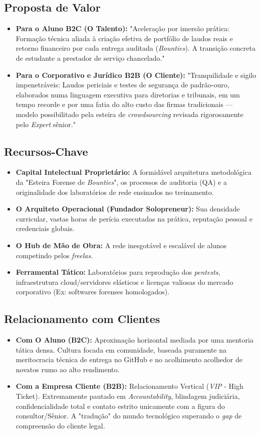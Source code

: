 \documentclass[../main.tex]{subfiles}
\begin{document}
\subsection*{Proposta de Valor}
\begin{itemize}
  \item \textbf{Para o Aluno B2C (O Talento):} "Aceleração por imersão prática: Formação técnica aliada à criação efetiva de portfólio de laudos reais e retorno financeiro por cada entrega auditada (\textit{Bounties}). A transição concreta de estudante a prestador de serviço chancelado."
  \item \textbf{Para o Corporativo e Jurídico B2B (O Cliente):} "Tranquilidade e sigilo impenetráveis: Laudos periciais e testes de segurança de padrão-ouro, elaborados numa linguagem executiva para diretorias e tribunais, em um tempo recorde e por uma fatia do alto custo das firmas tradicionais — modelo possibilitado pela esteira de \textit{crowdsourcing} revisada rigorosamente pelo \textit{Expert} sênior."
\end{itemize}

\subsection*{Recursos-Chave}
\begin{itemize}
  \item \textbf{Capital Intelectual Proprietário:} A formidável arquitetura metodológica da "Esteira Forense de \textit{Bounties}", os processos de auditoria (QA) e a originalidade dos laboratórios de rede ensinados no treinamento.
  \item \textbf{O Arquiteto Operacional (Fundador Solopreneur):} Sua densidade curricular, vastas horas de perícia executadas na prática, reputação pessoal e credenciais globais.
  \item \textbf{O Hub de Mão de Obra:} A rede inesgotável e escalável de alunos competindo pelos \textit{freelas}.
  \item \textbf{Ferramental Tático:} Laboratórios para reprodução dos \textit{pentests}, infraestrutura cloud/servidores elásticos e licenças valiosas do mercado corporativo (Ex: softwares forenses homologados).
\end{itemize}

\subsection*{Relacionamento com Clientes}
\begin{itemize}
  \item \textbf{Com O Aluno (B2C):} Aproximação horizontal mediada por uma mentoria tática densa. Cultura focada em comunidade, baseada puramente na meritocracia técnica de entrega no GitHub e no acolhimento acolhedor de novatos rumo ao alto rendimento.
  \item \textbf{Com a Empresa Cliente (B2B):} Relacionamento Vertical (\textit{VIP} - High Ticket). Extremamente pautado em \textit{Accountability}, blindagem judiciária, confidencialidade total e contato estrito unicamente com a figura do consultor/Sênior. A "tradução" do mundo tecnológico superando o \textit{gap} de compreensão do cliente legal.
\end{itemize}
\end{document}
